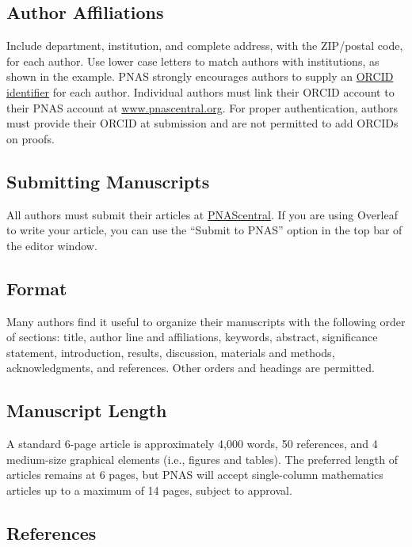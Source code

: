 \documentclass[9pt,twoside]{pnas-new}
\begin{document}
\subsection*{Author Affiliations}

Include department, institution, and complete address, with the ZIP/postal code, for each author. Use lower case letters to match authors with institutions, as shown in the example. PNAS strongly encourages authors to supply an \href{https://orcid.org/}{ORCID identifier} for each author. Individual authors must link their ORCID account to their PNAS account at \href{http://www.pnascentral.org/}{www.pnascentral.org}. For proper authentication, authors must provide their ORCID at submission and are not permitted to add ORCIDs on proofs.

\subsection*{Submitting Manuscripts}

All authors must submit their articles at \href{http://www.pnascentral.org/cgi-bin/main.plex}{PNAScentral}. If you are using Overleaf to write your article, you can use the ``Submit to PNAS'' option in the top bar of the editor window.

\subsection*{Format}

Many authors find it useful to organize their manuscripts with the following order of sections: title, author line and affiliations, keywords, abstract, significance statement, introduction, results, discussion, materials and methods, acknowledgments, and references. Other orders and headings are permitted.

\subsection*{Manuscript Length}

A standard 6-page article is approximately 4,000 words, 50 references, and 4 medium-size graphical elements (i.e., figures and tables). The preferred length of articles remains at 6 pages, but PNAS will accept single-column mathematics articles up to a maximum of 14 pages, subject to approval.

\subsection*{References}
\end{document}

